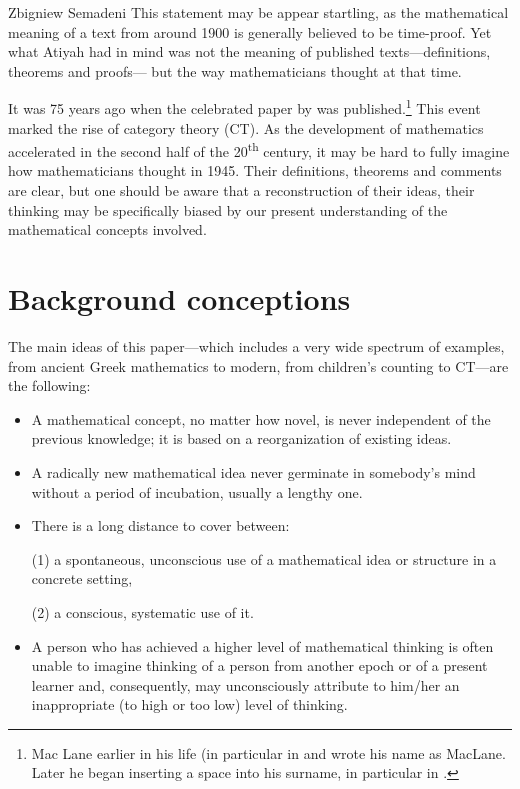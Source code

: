 \begin{artengenv}{Zbigniew Semadeni}
This statement may be appear startling, as the mathematical meaning of a text from 
around 1900 is generally believed to be time-proof. Yet what Atiyah had in mind was 
not the meaning of published texts---definitions, theorems and proofs---
but the way mathematicians thought at that time. 

It was 75 years ago when the celebrated paper by 
\citeauthor{E-ML} was published.\footnote{Mac Lane earlier in his life (in particular 
in \parencite{E-ML} and \parencite{Duality} wrote his name as MacLane. Later he 
began inserting a space into his surname, in particular in \parencite{Working}. } 
This event marked the rise of category theory (CT). As the 
development of mathematics accelerated in the second half of the 20\textsuperscript{th} century, 
it may be hard to fully imagine how mathematicians thought in 1945. Their 
definitions, theorems and comments are clear, but one should be aware that a 
reconstruction of their ideas, their thinking may be specifically biased by our 
present understanding of the mathematical concepts involved. 

\section{Background conceptions}
The main ideas of this paper---which includes a very wide spectrum 
of examples, from ancient Greek mathematics to modern, from children’s counting 
to CT---are the following: 
\begin{itemize} 
\item A mathematical concept, no matter how novel, is never independent of the 
previous knowledge; it is based on a reorganization of existing ideas. 
\item A radically new mathematical idea never germinate in somebody's mind 
without a period of incubation, usually a lengthy one. 
\item There is a long distance to cover between: \par 
(1) a spontaneous, unconscious use of a mathematical idea or structure in a concrete 
setting, \par 
(2) a conscious, systematic use of it. 
\item A person who has achieved a higher level of mathematical thinking is often 
unable to imagine thinking of a person from another epoch or of a present learner 
and, consequently, may unconsciously attribute to him/her an inappropriate (to high 
or too low) level of thinking.  
\end{itemize}


\end{artengenv}
